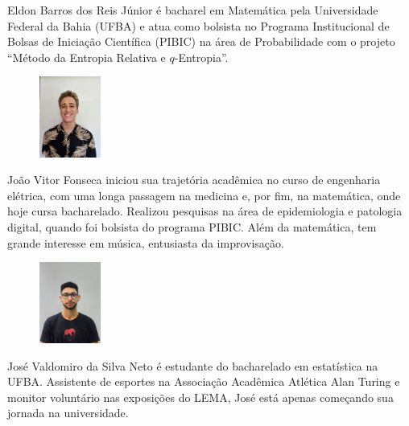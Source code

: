 \documentclass[onecolumn]{hipatia}
\begin{document}
\begin{center}
\begin{minipage}{12cm}
\begin{figure}
\end{figure}
Eldon Barros dos Reis Júnior é bacharel 
em Matemática pela Universidade Federal da Bahia (UFBA) 
e atua como bolsista no Programa Institucional de 
Bolsas de Iniciação Científica (PIBIC) na área de Probabilidade com o projeto
``Método da Entropia Relativa e $q$-Entropia''.
\end{minipage}
\begin{minipage}{12cm}
	\vspace{0.3cm}
	\begin{figure}
		\vspace{-10pt}
			\includegraphics[width=2cm]{joao.jpeg}
		\end{figure}
		João Vitor Fonseca iniciou sua trajetória acadêmica no curso de engenharia elétrica, com uma longa passagem na medicina e, por fim, na matemática, onde hoje cursa bacharelado. Realizou pesquisas na área de epidemiologia e patologia digital, quando foi bolsista do programa PIBIC. Além da matemática, tem grande interesse em música, entusiasta da improvisação.
	\end{minipage}
	\begin{minipage}{12cm}
		\vspace{0.3cm}
		\begin{figure}
			\vspace{-10pt}
				\includegraphics[width=2cm]{jose.jpeg}
			\end{figure}
			José Valdomiro da Silva Neto é estudante do bacharelado em estatística na UFBA. Assistente de esportes na Associação Acadêmica Atlética Alan Turing e monitor voluntário nas exposições do LEMA, José está apenas começando sua jornada na universidade.
		\end{minipage}	
\begin{minipage}{12cm}
	\vspace{0.3cm}
	\begin{figure}

\end{figure}
\end{minipage}
\end{center}
\end{document}
